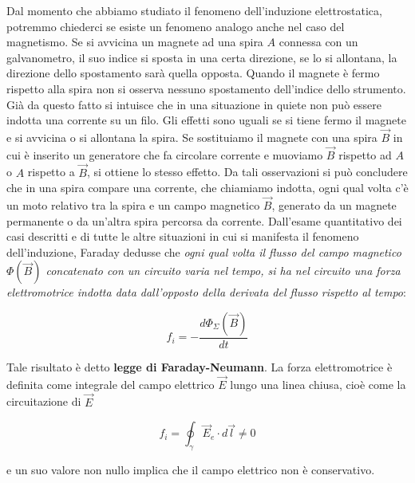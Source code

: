 Dal momento che abbiamo studiato il fenomeno dell'induzione elettrostatica, potremmo chiederci se esiste un fenomeno analogo anche nel caso del magnetismo.
Se si avvicina un magnete ad una spira $A$ connessa con un galvanometro, il suo indice si sposta in una certa direzione, se lo si allontana, la direzione dello spostamento sarà quella opposta. Quando il magnete è fermo rispetto alla spira non si osserva nessuno spostamento dell'indice dello strumento. Già da questo fatto si intuisce che in una situazione in quiete non può essere indotta una corrente su un filo. Gli effetti sono uguali se si tiene fermo il magnete e si avvicina o si allontana la spira. Se sostituiamo il magnete con una spira $\vec{B}$ in cui è inserito un generatore che fa circolare corrente e muoviamo $\vec{B}$ rispetto ad $A$ o $A$ rispetto a $\vec{B}$, si ottiene lo stesso effetto. Da tali osservazioni si può concludere che in una spira compare una corrente, che chiamiamo indotta, ogni qual volta c'è un moto relativo tra la spira e un campo magnetico $\vec{B}$, generato da un magnete permanente o da un'altra spira percorsa da corrente.
Dall'esame quantitativo dei casi descritti e di tutte le altre situazioni in cui si manifesta il fenomeno dell'induzione, Faraday dedusse che \emph{ogni qual volta il flusso del campo magnetico $\Phi (\vec{B})$ concatenato con un circuito varia nel tempo, si ha nel circuito una forza elettromotrice indotta data dall'opposto della derivata del flusso rispetto al tempo}:

\[
	\boxed{f_i = - \frac{d\Phi_{\Sigma}(\vec{B} )}{dt}}
\]

Tale risultato è detto \textbf{legge di Faraday-Neumann}.
La forza elettromotrice è definita come integrale del campo elettrico $\vec{E}$ lungo una linea chiusa, cioè come la circuitazione di $ \vec{E}  $

\[
	f_i=\oint_{\gamma} \vec{E}_e  \cdot d\vec{l} \neq 0
\]

e un suo valore non nullo implica che il campo elettrico non è conservativo.

